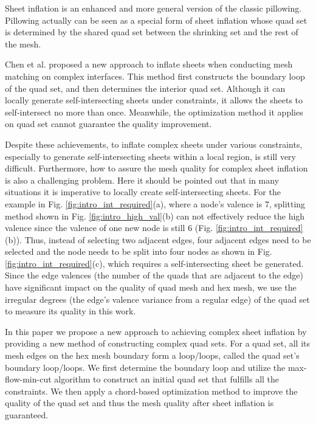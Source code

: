 \documentclass[final,5p,times,twocolumn]{elsarticle}
\begin{document}
Sheet inflation is an enhanced and more general version of the classic pillowing. Pillowing actually can be seen as a special form of sheet inflation whose quad set is determined by the shared quad set between the shrinking set and the rest of the mesh.

Chen et al. proposed a new approach to inflate sheets when conducting mesh matching on complex interfaces\cite{Chen:2015kf}. This method first constructs the boundary loop of the quad set, and then determines the interior quad set. Although it can locally generate self-intersecting sheets under constraints, it allows the sheets to self-intersect no more than once. Meanwhile, the optimization method it applies on quad set cannot guarantee the quality improvement.

Despite these achievements, to inflate complex sheets under various constraints, especially to generate self-intersecting sheets within a local region, is still very difficult. Furthermore, how to assure the mesh quality for complex sheet inflation is also a challenging problem. Here it should be pointed out that in many situations it is imperative to locally create self-intersecting sheets. For the example in Fig. \ref{fig:intro_int_required}(a), where a node's valence is 7, splitting method shown in Fig. \ref{fig:intro_high_val}(b) can not effectively reduce the high valence since the valence of one new node is still 6 (Fig. \ref{fig:intro_int_required}(b)). Thus, instead of selecting two adjacent edges, four adjacent edges need to be selected and the node needs to be split into four nodes as shown in Fig. \ref{fig:intro_int_required}(c), which requires a self-intersecting sheet be generated. Since the edge valences (the number of the quads that are adjacent to the edge) have significant impact on the quality of quad mesh and hex mesh\cite{Staten2010d}, we use the irregular degrees (the edge's valence variance from a regular edge) of the quad set\cite{Chen:2015kf} to measure its quality in this work.

In this paper we propose a new approach to achieving complex sheet inflation by providing a new method of constructing complex quad sets. For a quad set, all its mesh edges on the hex mesh boundary form a loop/loops, called the quad set's boundary loop/loops. We first determine the boundary loop and utilize the max-flow-min-cut algorithm\cite{lawler20014} to construct an initial quad set that fulfills all the constraints. We then apply a chord-based optimization method to improve the quality of the quad set and thus the mesh quality after sheet inflation is guaranteed.
\end{document}

